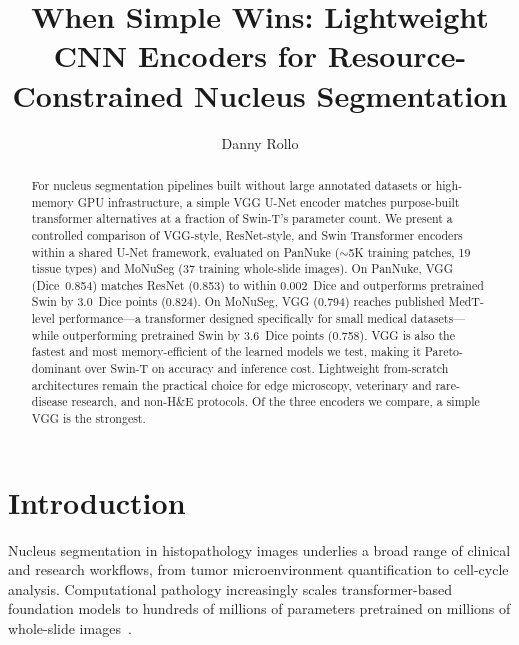 \documentclass[runningheads]{llncs}
\begin{document}
%
\title{When Simple Wins: Lightweight CNN Encoders for Resource-Constrained Nucleus Segmentation}
%
\author{Danny Rollo}
%
\maketitle
%
\begin{abstract}
For nucleus segmentation pipelines built without large annotated datasets or high-memory GPU infrastructure, a simple VGG U-Net encoder matches purpose-built transformer alternatives at a fraction of Swin-T's parameter count. We present a controlled comparison of VGG-style, ResNet-style, and Swin Transformer encoders within a shared U-Net framework, evaluated on PanNuke (${\sim}$5K training patches, 19 tissue types) and MoNuSeg (37 training whole-slide images). On PanNuke, VGG (Dice~0.854) matches ResNet (0.853) to within 0.002~Dice and outperforms pretrained Swin by 3.0~Dice points (0.824). On MoNuSeg, VGG (0.794) reaches published MedT-level performance---a transformer designed specifically for small medical datasets---while outperforming pretrained Swin by 3.6~Dice points (0.758). VGG is also the fastest and most memory-efficient of the learned models we test, making it Pareto-dominant over Swin-T on accuracy and inference cost. Lightweight from-scratch architectures remain the practical choice for edge microscopy, veterinary and rare-disease research, and non-H\&E protocols. Of the three encoders we compare, a simple VGG is the strongest.

\end{abstract}

\section{Introduction}

Nucleus segmentation in histopathology images underlies a broad range of clinical and research workflows, from tumor microenvironment quantification to cell-cycle analysis. Computational pathology increasingly scales transformer-based foundation models to hundreds of millions of parameters pretrained on millions of whole-slide images~\cite{chen2024uni,vorontsov2024virchow}.
\end{document}
